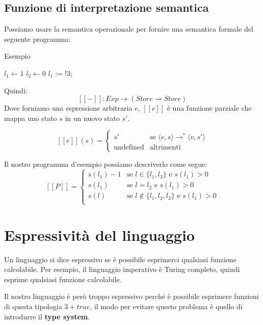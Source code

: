 \subsection{Funzione di interpretazione semantica}
Possiamo usare la semantica operazionale per fornire una semantica 
formale del seguente programma:
\begin{algorithm}
  \caption{Esempio}
  $l_1 \leftarrow 1$\;
  $l_2 \leftarrow 0$\;
  $l_1 := !3;$
\end{algorithm}
Quindi:
\[
  [\![ - ]\!]: Exp \rightarrow (Store \rightharpoonup Store)
\]
Dove forniamo una espressione arbitraria $e$, $[\![e]\!]$ è una 
funzione parziale che mappa uno stato $s$ in un nuovo stato $s'$.
\begin{tcolorbox}[title={Definizione}]
  \[
    [\![e]\!](s) = 
    \begin{cases}
      s' & \text{se } \langle e, s \rangle \rightarrow^* \langle v, s' \rangle \\
      \text{undefined} & \text{altrimenti}
    \end{cases}
  \]
\end{tcolorbox}
Il nostro programma d'esempio possiamo descriverlo come segue:
\[
  [\![P]\!] = 
  \begin{cases}
    s(l_1) - 1 & \text{se } l \in \{l_1, l_3\} \text{ e } s(l_1) > 0\\
    s(l_1) & \text{se } l = l_2 \text{ e } s(l_1) > 0 \\
    s(l) & \text{se } l \not \in \{l_1, l_2, l_3\} \text{ e } s(l_1) > 0\\
  \end{cases}
\]
\section{Espressività del linguaggio}
Un linguaggio si dice espressivo se è possibile esprimerci qualsiasi funzione
calcolabile. Per esempio, il linguaggio imperativo è Turing completo, quindi
esprime qualsiasi funzione calcolabile.

Il nostro linguaggio è però troppo espressivo perché è possibile esprimere
funzioni di questa tipologia $3 + true$, il modo per evitare 
questo problema è quello di introdurre il \textbf{type system}.